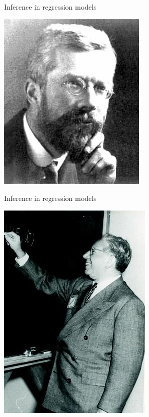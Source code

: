 \documentclass[10pt]{beamer}
\begin{document}
  
  \begin{frame}{Inference in regression models}
  \vspace{-1.5cm}
  \begin{flushright}
    \includegraphics[width=\threefig]{Figures/fisher.jpg}
  \end{flushright}
  \vfill 
  \end{frame}
  
  \begin{frame}{Inference in regression models}
    \vspace{-1.5cm}
    \begin{flushright}
      \includegraphics[width=\threefig]{Figures/wald2}
    \end{flushright}
    \vfill 
  \end{frame}
  
\end{document}
